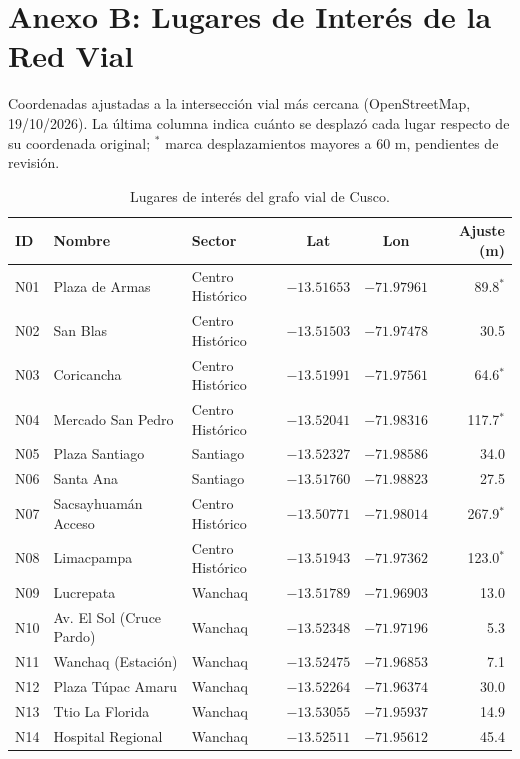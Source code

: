 \section*{Anexo B: Lugares de Interés de la Red Vial}

Coordenadas ajustadas a la intersección vial más cercana (OpenStreetMap, 19/10/2026). La última columna indica cuánto se desplazó cada lugar respecto de su coordenada original; $^{*}$ marca desplazamientos mayores a 60 m, pendientes de revisión.

\begin{table}[h]
    \centering
    \caption{Lugares de interés del grafo vial de Cusco.}
    \label{tab:nodos}
    \footnotesize
    \begin{tabular}{lllccr}
        \toprule
        \textbf{ID} & \textbf{Nombre} & \textbf{Sector} & \textbf{Lat} & \textbf{Lon} & \textbf{Ajuste (m)} \\
        \midrule
        N01 & Plaza de Armas & Centro Histórico & $-13.51653$ & $-71.97961$ & 89.8$^{*}$ \\
        N02 & San Blas & Centro Histórico & $-13.51503$ & $-71.97478$ & 30.5 \\
        N03 & Coricancha & Centro Histórico & $-13.51991$ & $-71.97561$ & 64.6$^{*}$ \\
        N04 & Mercado San Pedro & Centro Histórico & $-13.52041$ & $-71.98316$ & 117.7$^{*}$ \\
        N05 & Plaza Santiago & Santiago & $-13.52327$ & $-71.98586$ & 34.0 \\
        N06 & Santa Ana & Santiago & $-13.51760$ & $-71.98823$ & 27.5 \\
        N07 & Sacsayhuamán Acceso & Centro Histórico & $-13.50771$ & $-71.98014$ & 267.9$^{*}$ \\
        N08 & Limacpampa & Centro Histórico & $-13.51943$ & $-71.97362$ & 123.0$^{*}$ \\
        N09 & Lucrepata & Wanchaq & $-13.51789$ & $-71.96903$ & 13.0 \\
        N10 & Av. El Sol (Cruce Pardo) & Wanchaq & $-13.52348$ & $-71.97196$ & 5.3 \\
        N11 & Wanchaq (Estación) & Wanchaq & $-13.52475$ & $-71.96853$ & 7.1 \\
        N12 & Plaza Túpac Amaru & Wanchaq & $-13.52264$ & $-71.96374$ & 30.0 \\
        N13 & Ttio La Florida & Wanchaq & $-13.53055$ & $-71.95937$ & 14.9 \\
        N14 & Hospital Regional & Wanchaq & $-13.52511$ & $-71.95612$ & 45.4 \\

\end{tabular}
\end{table}
